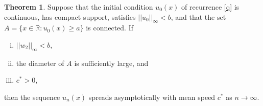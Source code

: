 \documentclass[11pt]{article}
\theoremstyle{definition}
\newtheorem{thm}{Theorem}
\numberwithin{equation}{section}
\numberwithin{thm}{section}
\renewcommand{\a}{a}
\renewcommand{\b}{b}
\begin{document}
\begin{thm} \label{theorem2}
Suppose that the initial condition $u_0(x)$ of recurrence \eqref{q} is continuous, has compact support, satisfies $|| u_0 || _\infty < \b$, and that the set $A = \{ x \in \mathbb R : u_0(x) \geq \a \}$ is connected. If
\begin{enumerate}[i.]
\item $||w_2|| _\infty < \b$,
\item the diameter of $A$ is sufficiently large, and 
\item $c^* > 0$,
\end{enumerate}
then the sequence $u_n(x)$ spreads asymptotically with mean speed $c^*$ as $n\to\infty$.
\end{thm}

\newcommand{\what}{\tilde{w_1}}
\newcommand{\whattwo}{\tilde{w_2}}
\newcommand{\whatgen}{\tilde{w}}
\end{document}
